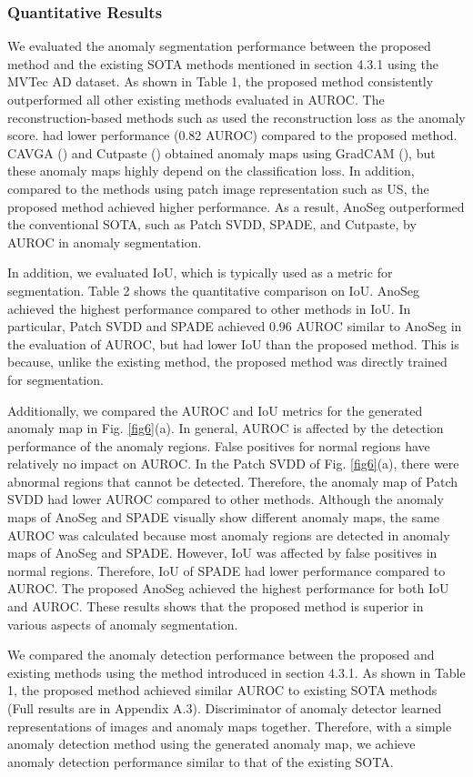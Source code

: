 \documentclass{article} \usepackage{iclr2022_conference,times}
\begin{document}
\subsubsection{Quantitative Results}
We evaluated the anomaly segmentation performance between the proposed method and the existing SOTA methods mentioned in section 4.3.1 using the MVTec AD dataset. As shown in Table 1, the proposed method consistently outperformed all other existing methods evaluated in AUROC. The reconstruction-based methods such as  used the reconstruction loss as the anomaly score.  had lower performance (0.82 AUROC) compared to the proposed method. CAVGA (\cite{eatt}) and Cutpaste (\cite{cut}) obtained anomaly maps using GradCAM (\cite{grad}), but these anomaly maps highly depend on the classification loss. In addition, compared to the methods using patch image representation such as US, the proposed method achieved higher performance. As a result, AnoSeg outperformed the conventional SOTA, such as Patch SVDD, SPADE, and Cutpaste, by  AUROC in anomaly segmentation.

In addition, we evaluated IoU, which is typically used as a metric for segmentation. Table 2 shows the quantitative comparison on IoU. AnoSeg achieved the highest performance compared to other methods in IoU. In particular, Patch SVDD and SPADE achieved 0.96 AUROC similar to AnoSeg in the evaluation of AUROC, but had lower IoU than the proposed method. This is because, unlike the existing method, the proposed method was directly trained for segmentation.

Additionally, we compared the AUROC and IoU metrics for the generated anomaly map in Fig. \ref{fig6}(a). In general, AUROC is affected by the detection performance of the anomaly regions. False positives for normal regions have relatively no impact on AUROC. In the Patch SVDD of Fig. \ref{fig6}(a), there were abnormal regions that cannot be detected. Therefore, the anomaly map of Patch SVDD had lower AUROC compared to other methods. Although the anomaly maps of AnoSeg and SPADE visually show different anomaly maps, the same AUROC was calculated because most anomaly regions are detected in anomaly maps of AnoSeg and SPADE. However, IoU was affected by false positives in normal regions. Therefore, IoU of SPADE had lower performance compared to AUROC. The proposed AnoSeg achieved the highest performance for both IoU and AUROC. These results shows that the proposed method is superior in various aspects of anomaly segmentation. 

We compared the anomaly detection performance between the proposed and existing methods using the method introduced in section 4.3.1. As shown in Table 1, the proposed method achieved similar AUROC to existing SOTA methods (Full results are in Appendix A.3). Discriminator of anomaly detector learned representations of images and anomaly maps together. Therefore, with a simple anomaly detection method using the generated anomaly map, we achieve anomaly detection performance similar to that of the existing SOTA.
\end{document}
